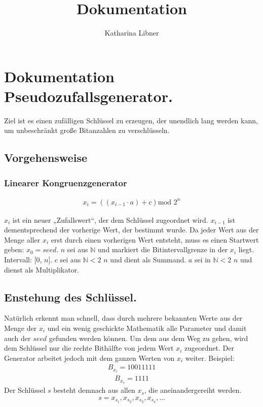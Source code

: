 \documentclass[10pt,a4paper]{article}
\author{Katharina Libner}
\title{Dokumentation}
\begin{document}
\maketitle
\tableofcontents
\newpage

\section{Dokumentation Pseudozufallsgenerator.}
Ziel ist es einen \glqq zufälligen\grqq{} Schlüssel zu erzeugen, der unendlich lang werden kann, um unbeschränkt große Bitanzahlen zu verschlüsseln.
\subsection{Vorgehensweise}

\subsubsection{Linearer Kongruenzgenerator}
\begin{align*}
    x_i=\left(\left( x_{i-1}\cdot a\right) +c\right) \text{mod } 2^n
\end{align*}

$x_i$ ist ein neuer „Zufallswert“, der dem Schlüssel zugeordnet wird.
$x_{i-1}$ ist dementsprechend der vorherige Wert, der bestimmt wurde.
Da jeder Wert aus der Menge aller $x_i$ erst durch einen vorherigen Wert entsteht, muss es einen
Startwert geben: $x_0 = seed $.
$n$ sei aus $ \mathbb{N} $ und markiert die Bitintervallgrenze in der $x_i$
liegt. Intervall: [0, $n$].
$c$ sei aus  $ \mathbb{N}<2 $
$n$ und dient als Summand.
$a$ sei in $ \mathbb{N}< 2 $
$n$ und dienst als Multiplikator.
\subsection{Enstehung des Schlüssel.}
Natürlich erkennt man schnell, dass durch mehrere bekannten Werte aus der Menge der $x_i$ und ein wenig geschickte Mathematik alle Parameter und damit auch der $seed$ gefunden werden können. Um dem aus dem Weg zu gehen, wird dem Schlüssel nur die rechte Bithälfte von jedem Wert $x_i$ zugeordnet. Der Generator arbeitet jedoch mit dem ganzen Werten von $x_i$ weiter. Beispiel:
\begin{align*}
    B_{x_i} = 1001 1111
\end{align*}
\begin{align*}
    B_{x_s} = 1111
\end{align*}
Der Schlüssel $s$ besteht demnach aus allen $x_s$, die aneinandergereiht werden.
\begin{align*}
    s = x_{s_1}, x_{s_2}, x_{s_3}, x_{s_4}, ...
\end{align*}
\end{document}
